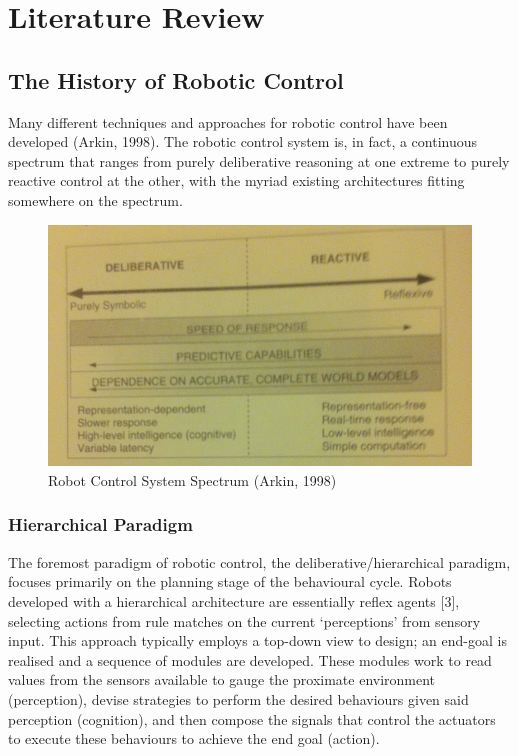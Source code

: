 \documentclass{article}
\begin{document}
    \section{Literature Review}
	\subsection{The History of Robotic Control}
	Many different techniques and approaches for robotic control have been developed (Arkin, 1998). The robotic control system is, in fact, a continuous spectrum that ranges from purely deliberative reasoning at one extreme to purely reactive control at the other, with the myriad existing architectures fitting somewhere on the spectrum.
	
	\begin{figure}[h!]
	\centering
	\includegraphics[width=0.8\linewidth]{LiteratureReview1}
	\caption{Robot Control System Spectrum (Arkin, 1998)}
	\end{figure}

	\subsubsection{Hierarchical Paradigm}
	The foremost paradigm of robotic control, the deliberative/hierarchical paradigm, focuses primarily on the planning stage of the behavioural cycle. Robots developed with a hierarchical architecture are essentially reflex agents [3], selecting actions from rule matches on the current ‘perceptions’ from sensory input. This approach typically employs a top-down view to design; an end-goal is realised and a sequence of modules are developed. These modules work to read values from the sensors available to gauge the proximate environment (perception), devise strategies to perform the desired behaviours given said perception (cognition), and then compose the signals that control the actuators to execute these behaviours to achieve the end goal (action).
\end{document}
